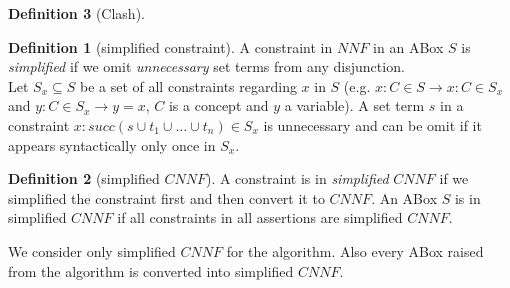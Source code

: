 \documentclass[a4paper,11pt]{scrartcl}
\theoremstyle{break}
\theoremstyle{definition}
\newtheorem{mydef}{Definition}
\begin{document}
\begin{mydef}[Clash]
\begin{mydef}[simplified constraint]
A constraint in $NNF$ in an ABox $S$ is \textit{simplified} if we omit \textit{unnecessary} set terms from any disjunction.\\
Let $S_x\subseteq S$ be a set of all constraints regarding $x$ in $S$ (e.g. $x:C\in S\rightarrow x:C\in S_x$ and $y:C\in S_x\rightarrow y=x$, $C$ is a concept and $y$ a variable). A set term $s$ in a constraint $x:succ(s\cup t_1\cup\dots\cup t_n)\in S_x$ is unnecessary and can be omit if it appears syntactically only once in $S_x$.
\end{mydef}
\begin{mydef}[simplified $CNNF$]
A constraint is in \textit{simplified} $CNNF$ if we simplified the constraint first and then convert it to $CNNF$. An ABox $S$ is in simplified $CNNF$ if all constraints in all assertions are simplified $CNNF$.
\end{mydef}
We consider only simplified $CNNF$ for the algorithm. Also every ABox raised from the algorithm is converted into simplified $CNNF$.

\end{mydef}
\end{document}
